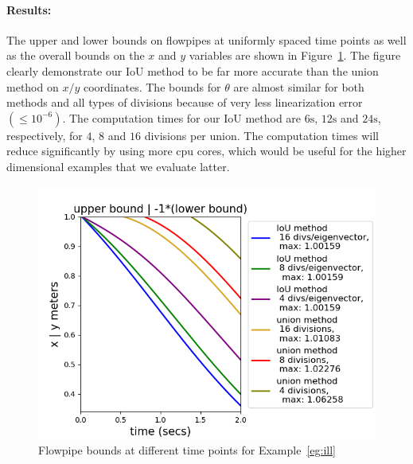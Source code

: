 \paragraph{Results:}  The upper and lower bounds on flowpipes at uniformly spaced time
points as well as the overall bounds on the $x$ and $y$ variables are
shown in Figure~\ref{fig:ill}.  The figure clearly demonstrate our IoU
method to be far more accurate than the union method on $x/y$
coordinates.  The bounds for $\theta$ are almost similar for both
methods and all types of divisions because of very less linearization
error $(\le 10^{-6})$.  The computation times for our IoU method are $6\si{\second}$, $12\si{\second}$ and $24\si{\second}$, respectively, for $4$, $8$ and $16$ divisions
per union.  The computation times will reduce significantly by using
more cpu cores, which would be useful for the higher dimensional
examples that we evaluate latter.
%
\begin{figure}
  \includegraphics[scale = 0.7]{illImages/Ub.png}
  \caption{Flowpipe bounds at different time points for
    Example~\ref{eg:ill}}
  \label{fig:ill}
\end{figure}
%

